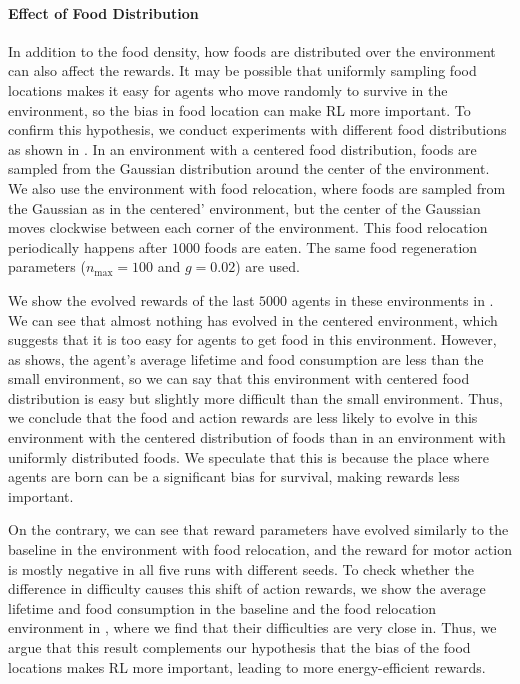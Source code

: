 \paragraph{Effect of Food Distribution}
In addition to the food density, how foods are distributed over the environment can also affect the rewards. It may be possible that uniformly sampling food locations makes it easy for agents who move randomly to survive in the environment, so the bias in food location can make RL more important. To confirm this hypothesis, we conduct experiments with different food distributions as shown in . In an environment with a centered food distribution, foods are sampled from the Gaussian distribution around the center of the environment. We also use the environment with food relocation, where foods are sampled from the Gaussian as in the centered' environment, but the center of the Gaussian moves clockwise between each corner of the environment. This food relocation periodically happens after $1000$ foods are eaten. The same food regeneration parameters ($n_{\mathrm{max}} = 100$ and $g = 0.02$) are used.

We show the evolved rewards of the last $5000$ agents in these environments in . We can see that almost nothing has evolved in the centered environment, which suggests that it is too easy for agents to get food in this environment. However, as  shows, the agent's average lifetime and food consumption are less than the small environment, so we can say that this environment with centered food distribution is easy but slightly more difficult than the small environment. Thus, we conclude that the food and action rewards are less likely to evolve in this environment with the centered distribution of foods than in an environment with uniformly distributed foods. We speculate that this is because the place where agents are born can be a significant bias for survival, making rewards less important.

On the contrary, we can see that reward parameters have evolved similarly to the baseline in the environment with food relocation, and the reward for motor action is mostly negative in all five runs with different seeds. To check whether the difference in difficulty causes this shift of action rewards, we show the average lifetime and food consumption in the baseline and the food relocation environment in , where we find that their difficulties are very close in. Thus, we argue that this result complements our hypothesis that the bias of the food locations makes RL more important, leading to more energy-efficient rewards.

